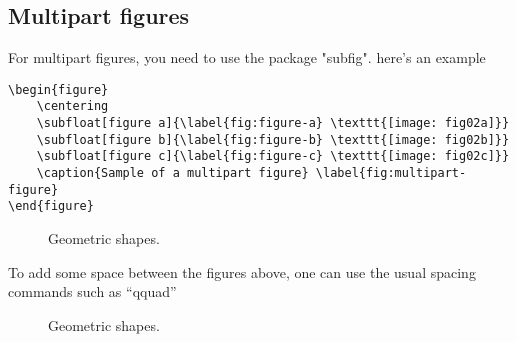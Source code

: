 \subsection{Multipart figures}
For multipart figures, you need to use the package "subfig". here's an example
\begin{verbatim}
\begin{figure}
    \centering
    \subfloat[figure a]{\label{fig:figure-a} \texttt{[image: fig02a]}}
    \subfloat[figure b]{\label{fig:figure-b} \texttt{[image: fig02b]}}
    \subfloat[figure c]{\label{fig:figure-c} \texttt{[image: fig02c]}}
    \caption{Sample of a multipart figure} \label{fig:multipart-figure}
\end{figure}
\end{verbatim}
\begin{figure}[h!]
        \centering
        \caption{Geometric shapes.}
        \label{fig:multipart-figure}
\end{figure}
To add some space between the figures above, one can use the usual spacing commands such as ``qquad''
\begin{figure}[h!]
        \centering
         \qquad
        \qquad
        \qquad
        \caption{Geometric shapes.}
        \label{fig:multipart-figure}
\end{figure} 